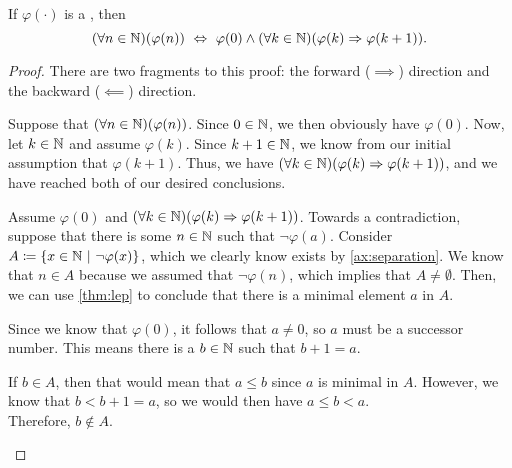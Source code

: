 \begin{theorem}
    If \(\varphi(\cdot)\) is a {\wff}, then
    \[
        \pn*{\forall n \in \N}\pn*{\varphi(n)}
        ~\iff~ \varphi(0) \meet \pn*{\forall k \in \N}\pn*{\varphi(k) \implies \varphi(k + 1)}.
    \]
\end{theorem}
\begin{proof}
    There are two fragments to this proof:
    the forward (\(\implies\)) direction and the backward (\(\impliedby\)) direction.

    \begin{case}
        Suppose that \(\pn*{\forall n \in \N}\pn*{\varphi(n)}\).
        Since \(0 \in \mathbb{N}\), we then obviously have \(\varphi(0)\).
        Now, let \(k \in \mathbb{N}\) and assume \(\varphi(k)\).
        Since \(k + 1 \in \mathbb{N}\), we know from our initial assumption that \(\varphi(k + 1)\).
        Thus, we have \(\pn*{\forall k \in \N}\pn*{\varphi(k) \implies \varphi(k + 1)}\),
        and we have reached both of our desired conclusions.
    \end{case}

    \begin{case}
        Assume \(\varphi(0)\) and \(\pn*{\forall k \in \N}\pn*{\varphi(k) \implies \varphi(k + 1)}\).
        Towards a contradiction,
        suppose that there is some \(n \in \mathbb{N}\) such that \(\neg \varphi(a)\).
        Consider \(A \defn \set*{x \in \N \suchthat \neg \varphi(x)}\),
        which we clearly know exists by \autoref{ax:separation}.
        We know that \(n \in A\) because we assumed that \(\neg \varphi(n)\),
        which implies that \(A \neq \emptyset\).
        Then, we can use \autoref{thm:lep} to conclude that there is a minimal element \(a\) in \(A\).

        Since we know that \(\varphi(0)\), it follows that \(a \neq 0\), so \(a\) must be a successor number.
        This means there is a \(b \in \mathbb{N}\) such that \(b + 1 = a\).

        If \(b \in A\), then that would mean that \(a \leq b\) since \(a\) is minimal in \(A\).
        However, we know that \(b < b + 1 = a\), so we would then have \(a \leq b < a\). \contradiction\\
        Therefore, \(b \not \in A\).

    \end{case}
\end{proof}

